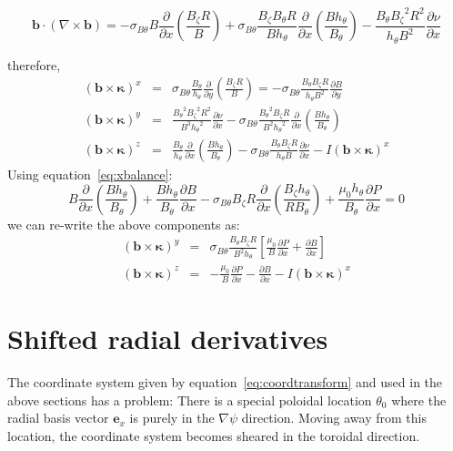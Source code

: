 \documentclass[12pt]{article}
\newcommand{\sbt}{\ensuremath{\sigma_{B\theta}}}
\newcommand{\deriv}[2]{\ensuremath{\frac{\partial #1}{\partial #2}}}
\newcommand{\hthe}{\ensuremath{h_\theta}}
\newcommand{\Bp}{\ensuremath{B_\theta}}
\newcommand{\Bt}{\ensuremath{B_\zeta}}
\newcommand{\Vec}[1]{\ensuremath{\mathbf{#1}}}
\begin{document}
\[
\mathbf{b}\cdot\left(\nabla\times\mathbf{b}\right) = -\sbt B\deriv{}{x}\left(\frac{\Bt R}{B}\right) + \sbt \frac{\Bt\Bp R}{B\hthe}\deriv{}{x}\left(\frac{B\hthe}{\Bp}\right) - \frac{\Bp\Bt^2R^2}{\hthe B^2}\deriv{\nu}{x}
\]

therefore,
\begin{eqnarray*}
\left(\mathbf{b}\times\mathbf{\kappa}\right)^x &=& \sbt\frac{\Bp}{\hthe}\deriv{}{y}\left(\frac{\Bt R}{B}\right) = -\sbt\frac{\Bp\Bt R}{\hthe B^2}\deriv{B}{y} \\
\left(\mathbf{b}\times\mathbf{\kappa}\right)^y &=& \frac{\Bp^2\Bt^2 R^2}{B^3\hthe^2}\deriv{\nu}{x} - \sbt\frac{\Bp^2\Bt R}{B^2\hthe^2}\deriv{}{x}\left(\frac{B\hthe}{\Bp}\right) \\
\left(\mathbf{b}\times\mathbf{\kappa}\right)^z &=& \frac{\Bp}{\hthe}\deriv{}{x}\left(\frac{B\hthe}{\Bp}\right) - \sbt\frac{\Bp\Bt R}{\hthe B}\deriv{\nu}{x} - I\left(\mathbf{b}\times\mathbf{\kappa}\right)^x
\end{eqnarray*}
Using equation~\ref{eq:xbalance}:
\[
B\deriv{}{x}\left(\frac{B\hthe}{\Bp}\right) + \frac{B\hthe}{\Bp}\deriv{B}{x} - \sbt\Bt R\deriv{}{x}\left(\frac{\Bt\hthe}{R\Bp}\right) + \frac{\mu_0\hthe}{\Bp}\deriv{P}{x} = 0
\]
we can re-write the above components as:
\begin{eqnarray*}
\left(\mathbf{b}\times\mathbf{\kappa}\right)^y &=& \sbt\frac{\Bp\Bt R}{B^2\hthe}\left[\frac{\mu_0}{B}\deriv{P}{x} + \deriv{B}{x}\right] \\
\left(\mathbf{b}\times\mathbf{\kappa}\right)^z &=& -\frac{\mu_0}{B}\deriv{P}{x} - \deriv{B}{x} - I\left(\mathbf{b}\times\mathbf{\kappa}\right)^x
\end{eqnarray*}

\section{Shifted radial derivatives}
\label{sec:shiftcoords}

The coordinate system given by equation~\ref{eq:coordtransform} and used in the
above sections has a problem: There is a special poloidal location $\theta_0$
where the radial basis vector $\Vec{e}_x$ is purely in the $\nabla\psi$ direction.
Moving away from this location, the coordinate system becomes sheared in the toroidal
direction. 
\end{document}
